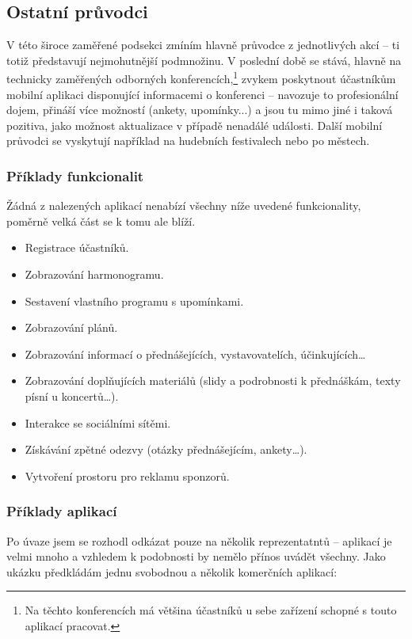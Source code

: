 \subsection{Ostatní průvodci}
V této široce zaměřené podsekci zmíním hlavně průvodce z jednotlivých akcí -- ti totiž představují nejmohutnější podmnožinu. V poslední době se stává, hlavně na technicky zaměřených odborných konferencích,\footnote{Na těchto konferencích má většina účastníků u sebe zařízení schopné s touto aplikací pracovat.} zvykem poskytnout účastníkům mobilní aplikaci disponující informacemi o konferenci -- navozuje to profesionální dojem, přináší více možností (ankety, upomínky...) a jsou tu mimo jiné i taková pozitiva, jako možnost aktualizace v případě nenadálé události. Další mobilní průvodci se vyskytují například na hudebních festivalech nebo po městech.

\subsubsection{Příklady funkcionalit}
Žádná z nalezených aplikací nenabízí všechny níže uvedené funkcionality, poměrně velká část se k tomu ale blíží.
\begin{itemize}
\item Registrace účastníků.
\item Zobrazování harmonogramu.
\item Sestavení vlastního programu s upomínkami.
\item Zobrazování plánů.
\item Zobrazování informací o přednášejících, vystavovatelích, účinkujících\dots
\item Zobrazování doplňujících materiálů (slidy a podrobnosti k přednáškám, texty písní u koncertů\dots).
\item Interakce se sociálními sítěmi.
\item Získávání zpětné odezvy (otázky přednášejícím, ankety\dots).
\item Vytvoření prostoru pro reklamu sponzorů. 
\end{itemize}

\subsubsection{Příklady aplikací}
Po úvaze jsem se rozhodl odkázat pouze na několik reprezentatntů -- aplikací je velmi mnoho a vzhledem k podobnosti by nemělo přínos uvádět všechny. Jako ukázku předkládám jednu svobodnou a několik komerčních aplikací:

